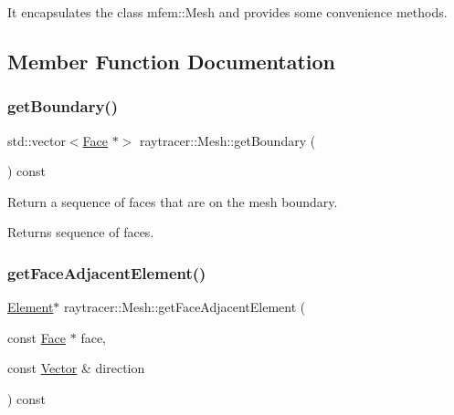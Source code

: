 It encapsulates the class mfem\+::\+Mesh and provides some convenience methods. 

\subsection{Member Function Documentation}
\mbox{\label{classraytracer_1_1Mesh_a4f2718e871ca63809445b33b56fa02de}} 
\subsubsection{\texorpdfstring{get\+Boundary()}{getBoundary()}}
{\footnotesize\ttfamily std\+::vector$<$\hyperlink{classraytracer_1_1Face}{Face} $\ast$$>$ raytracer\+::\+Mesh\+::get\+Boundary (\begin{DoxyParamCaption}{ }\end{DoxyParamCaption}) const}



Return a sequence of faces that are on the mesh boundary. 

\begin{DoxyReturn}{Returns}
sequence of faces. 
\end{DoxyReturn}
\mbox{\label{classraytracer_1_1Mesh_a37bb91c21c404e4ff4432d7169918c38}} 
\subsubsection{\texorpdfstring{get\+Face\+Adjacent\+Element()}{getFaceAdjacentElement()}}
{\footnotesize\ttfamily \hyperlink{classraytracer_1_1Element}{Element}$\ast$ raytracer\+::\+Mesh\+::get\+Face\+Adjacent\+Element (\begin{DoxyParamCaption}\item[{const \hyperlink{classraytracer_1_1Face}{Face} $\ast$}]{face,  }\item[{const \hyperlink{classraytracer_1_1Vector}{Vector} \&}]{direction }\end{DoxyParamCaption}) const}



